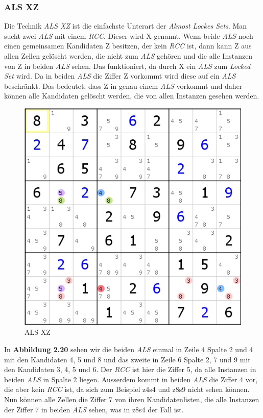 \newpage
\subsubsection{ALS XZ}
Die Technik \textit{ALS XZ} ist die einfachste Unterart der \textit{Almost Lockes Sets}. Man sucht zwei \textit{ALS} mit einem \textit{RCC}. Dieser wird X genannt. Wenn beide \textit{ALS} noch einen gemeinsamen Kandidaten Z besitzen, der kein \textit{RCC} ist, dann kann Z aus allen Zellen gelöscht werden, die nicht zum \textit{ALS} gehören und die alle Instanzen von Z in beiden \textit{ALS} sehen. Das funktioniert, da durch X ein \textit{ALS} zum \textit{Locked Set} wird. Da in beiden \textit{ALS} die Ziffer Z vorkommt wird diese auf ein \textit{ALS} beschränkt. Das bedeutet, dass Z in genau einem \textit{ALS} vorkommt und daher können alle Kandidaten gelöscht werden, die von allen Instanzen gesehen werden.

\begin{figure}[h]
\begin{center}
\includegraphics{./img/ALS_XZ.png}
\caption{ALS XZ}
\end{center}
\end{figure}

In \textbf{Abbildung 2.20} sehen wir die beiden \textit{ALS} einmal in Zeile 4 Spalte 2 und 4 mit den Kandidaten 4, 5 und 8 und das zweite in Zeile 6 Spalte 2, 7 und 9 mit den Kandidaten 3, 4, 5 und 6. Der \textit{RCC} ist hier die Ziffer 5, da alle Instanzen in beiden \textit{ALS} in Spalte 2 liegen. Ausserdem kommt in beiden \textit{ALS} die Ziffer 4 vor, die aber kein \textit{RCC} ist, da sich zum Beispiel z4s4 und z8s9 nicht sehen können. Nun können alle Zellen die Ziffer 7 von ihren Kandidatenlisten, die alle Instanzen der Ziffer 7 in beiden \textit{ALS} sehen, was in z8s4 der Fall ist.